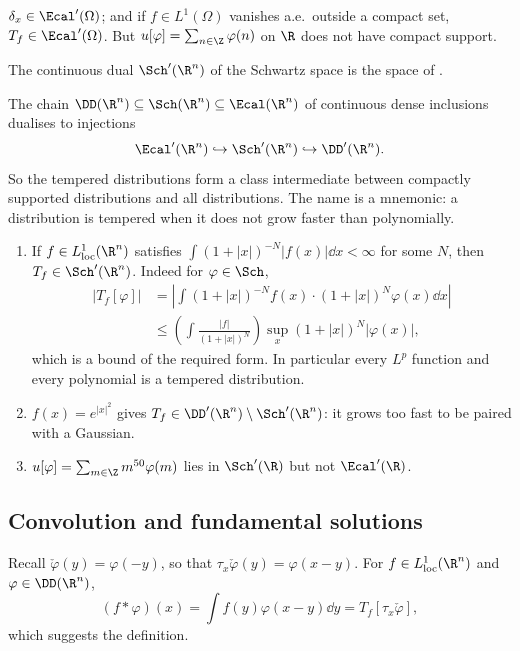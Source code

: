 \begin{example}
	$\delta_x \in \Ecal'(\Omega)$; and if $f \in L^1(\Omega)$ vanishes a.e.\ outside a compact set, $T_f\in\Ecal'(\Omega)$. But $u[\varphi]=\sum_{n\in\Z}\varphi(n)$ on $\R$ does not have compact support.
\end{example}

\begin{definition}
	The continuous dual $\Sch'(\R^n)$ of the Schwartz space is the space of .
\end{definition}

The chain $\DD(\R^n)\subseteq\Sch(\R^n)\subseteq\Ecal(\R^n)$ of continuous dense inclusions dualises to injections
$$\Ecal'(\R^n)\hookrightarrow\Sch'(\R^n)\hookrightarrow\DD'(\R^n).$$
So the tempered distributions form a class intermediate between compactly supported distributions and all distributions. The name is a mnemonic: a distribution is tempered when it does not grow faster than polynomially.

\begin{example}
	\begin{enumerate}[label=(\roman*)]
		\item If $f\in L^1_{\mathrm{loc}}(\R^n)$ satisfies $\int(1+|x|)^{-N}|f(x)|\dd x<\infty$ for some $N$, then $T_f\in\Sch'(\R^n)$. Indeed for $\varphi\in\Sch$,
		\begin{align*}
			|T_f[\varphi]| &=\left|\int(1+|x|)^{-N}f(x)\cdot(1+|x|)^N\varphi(x)\dd x\right| \\
			&\le\left(\int\frac{|f|}{(1+|x|)^N}\right)\sup_x(1+|x|)^N|\varphi(x)|,
		\end{align*}
		which is a bound of the required form. In particular every $L^p$ function and every polynomial is a tempered distribution.
		\item $f(x)=e^{|x|^2}$ gives $T_f\in\DD'(\R^n)\setminus\Sch'(\R^n)$: it grows too fast to be paired with a Gaussian.
		\item $u[\varphi]=\sum_{m\in\Z}m^{50}\varphi(m)$ lies in $\Sch'(\R)$ but not $\Ecal'(\R)$.
	\end{enumerate}
\end{example}

\subsection{Convolution and fundamental solutions}

Recall $\check\varphi(y)=\varphi(-y)$, so that $\tau_x\check\varphi(y)=\varphi(x-y)$. For $f \in L^1_{\mathrm{loc}}(\R^n)$ and $\varphi\in\DD(\R^n)$,
$$(f*\varphi)(x)=\int f(y)\varphi(x-y)\dd y = T_f[\tau_x\check\varphi],$$
which suggests the definition.

